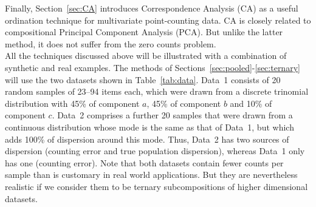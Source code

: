 \documentclass{article}
\begin{document}
Finally, Section~\ref{sec:CA} introduces Correspondence Analysis (CA)
as a useful ordination technique for multivariate point-counting
data. CA is closely related to compositional Principal Component
Analysis (PCA). But unlike the latter method, it does not suffer from
the zero counts problem.\\

All the techniques discussed above will be illustrated with a
combination of synthetic and real examples. The methods of
Sections~\ref{sec:pooled}-\ref{sec:ternary} will use the two datasets
shown in Table~\ref{tab:data}. Data~1 consists of 20 random samples of
23--94 items each, which were drawn from a discrete trinomial
distribution with 45\% of component $a$, 45\% of component $b$ and
10\% of component $c$.  Data~2 comprises a further 20 samples that
were drawn from a continuous distribution whose mode is the same as
that of Data~1, but which adds 100\% of dispersion around this
mode. Thus, Data~2 has two sources of dispersion (counting error and
true population dispersion), whereas Data~1 only has one (counting
error). Note that both datasets contain fewer counts per sample than
is customary in real world applications. But they are nevertheless
realistic if we consider them to be ternary subcompositions of higher
dimensional datasets.\\
\end{document}
